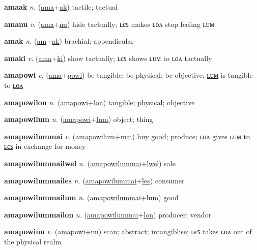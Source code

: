 \textbf{\hypertarget{amaak}{amaak}} \textit{n.} (\hyperlink{ama}{ama}+\allowbreak \hyperlink{ak}{ak})
tactile; tactual

\textbf{\hypertarget{amanu}{amanu}} \textit{v.} (\hyperlink{ama}{ama}+\allowbreak \hyperlink{nu}{nu})
hide tactually; ʟєꜱ makes ʟᴏᴧ stop feeling ʟᴜᴍ

\textbf{\hypertarget{amak}{amak}} \textit{n.} (\hyperlink{am}{am}+\allowbreak \hyperlink{ak}{ak})
brachial; appendicular

\textbf{\hypertarget{amaki}{amaki}} \textit{v.} (\hyperlink{ama}{ama}+\allowbreak \hyperlink{ki}{ki})
show tactually; ʟєꜱ shows ʟᴜᴍ to ʟᴏᴧ tactually

\textbf{\hypertarget{amapowi}{amapowi}} \textit{v.} (\hyperlink{ama}{ama}+\allowbreak \hyperlink{powi}{powi})
be tangible; be physical; be objective; \hyperlink{amapowilum}{ʟᴜᴍ} is tangible to \hyperlink{amapowilon}{ʟᴏᴧ}

\textbf{\hypertarget{amapowilon}{amapowilon}} \textit{n.} (\hyperlink{amapowi}{amapowi}+\allowbreak \hyperlink{lon}{lon})
tangible; physical; objective

\textbf{\hypertarget{amapowilum}{amapowilum}} \textit{n.} (\hyperlink{amapowi}{amapowi}+\allowbreak \hyperlink{lum}{lum})
object; thing

\textbf{\hypertarget{amapowilummai}{amapowilummai}} \textit{v.} (\hyperlink{amapowilum}{amapowilum}+\allowbreak \hyperlink{mai}{mai})
buy good; produce; \hyperlink{amapowilummailon}{ʟᴏᴧ} gives \hyperlink{amapowilummailum}{ʟᴜᴍ} to \hyperlink{amapowilummailes}{ʟєꜱ} in exchange for money

\textbf{\hypertarget{amapowilummailwel}{amapowilummailwel}} \textit{n.} (\hyperlink{amapowilummai}{amapowilummai}+\allowbreak \hyperlink{lwel}{lwel})
sale

\textbf{\hypertarget{amapowilummailes}{amapowilummailes}} \textit{n.} (\hyperlink{amapowilummai}{amapowilummai}+\allowbreak \hyperlink{les}{les})
consumer

\textbf{\hypertarget{amapowilummailum}{amapowilummailum}} \textit{n.} (\hyperlink{amapowilummai}{amapowilummai}+\allowbreak \hyperlink{lum}{lum})
good

\textbf{\hypertarget{amapowilummailon}{amapowilummailon}} \textit{n.} (\hyperlink{amapowilummai}{amapowilummai}+\allowbreak \hyperlink{lon}{lon})
producer; vendor

\textbf{\hypertarget{amapowinu}{amapowinu}} \textit{v.} (\hyperlink{amapowi}{amapowi}+\allowbreak \hyperlink{nu}{nu})
scan; abstract; intangiblise; \hyperlink{amapowinules}{ʟєꜱ} takes ʟᴏᴧ out of the physical realm

